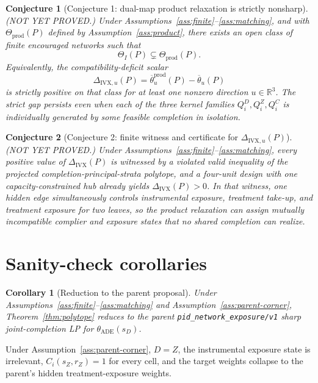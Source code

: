 \documentclass[11pt]{article}
\newcommand{\R}{\mathbb{R}}
\theoremstyle{definition}
\theoremstyle{plain}
\newtheorem{conjecture}{Conjecture}
\newtheorem{corollary}{Corollary}
\theoremstyle{remark}
\begin{document}
\begin{conjecture}[Conjecture 1: dual-map product relaxation is strictly nonsharp]\label{conj:strict}
(NOT YET PROVED.) Under Assumptions~\ref{ass:finite}--\ref{ass:matching}, and with \(\Theta_{\mathrm{prod}}(P)\) defined by Assumption~\ref{ass:product}, there exists an open class of finite encouraged networks such that
\[
\Theta_I(P)\subsetneq \Theta_{\mathrm{prod}}(P).
\]
Equivalently, the compatibility-deficit scalar
\[
\Delta_{\mathrm{IVX},u}(P)
=
\overline\theta^{\mathrm{prod}}_u(P)-\overline\theta_u(P)
\]
is strictly positive on that class for at least one nonzero direction \(u\in\R^3\). The strict gap persists even when each of the three kernel families \(Q_i^D,Q_i^Z,Q_i^C\) is individually generated by some feasible completion in isolation.
\end{conjecture}

\begin{conjecture}[Conjecture 2: finite witness and certificate for \(\Delta_{\mathrm{IVX},u}(P)\)]\label{conj:witness}
(NOT YET PROVED.) Under Assumptions~\ref{ass:finite}--\ref{ass:matching}, every positive value of \(\Delta_{\mathrm{IVX}}(P)\) is witnessed by a violated valid inequality of the projected completion-principal-strata polytope, and a four-unit design with one capacity-constrained hub already yields \(\Delta_{\mathrm{IVX}}(P)>0\). In that witness, one hidden edge simultaneously controls instrumental exposure, treatment take-up, and treatment exposure for two leaves, so the product relaxation can assign mutually incompatible complier and exposure states that no shared completion can realize.
\end{conjecture}

\section{Sanity-check corollaries}
\begin{corollary}[Reduction to the parent proposal]\label{cor:parent}
Under Assumptions~\ref{ass:finite}--\ref{ass:matching} and Assumption~\ref{ass:parent-corner}, Theorem~\ref{thm:polytope} reduces to the parent \texttt{pid\_network\_exposure/v1} sharp joint-completion LP for \(\theta_{\mathrm{ADE}}(s_D)\).
\end{corollary}
Under Assumption~\ref{ass:parent-corner}, \(D=Z\), the instrumental exposure state is irrelevant, \(C_i(s_Z,r_Z)=1\) for every cell, and the target weights collapse to the parent's hidden treatment-exposure weights.
\end{document}
